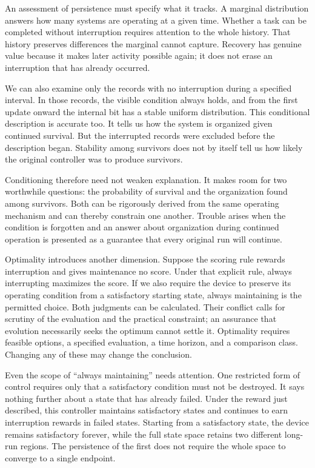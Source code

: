 \documentclass[
  english,
  11pt,
  oneside]{book}
\begin{document}
An assessment of persistence must specify what it tracks. A marginal distribution answers how many systems are operating at a given time. Whether a task can be completed without interruption requires attention to the whole history. That history preserves differences the marginal cannot capture. Recovery has genuine value because it makes later activity possible again; it does not erase an interruption that has already occurred.

We can also examine only the records with no interruption during a specified interval. In those records, the visible condition always holds, and from the first update onward the internal bit has a stable uniform distribution. This conditional description is accurate too. It tells us how the system is organized given continued survival. But the interrupted records were excluded before the description began. Stability among survivors does not by itself tell us how likely the original controller was to produce survivors.

Conditioning therefore need not weaken explanation. It makes room for two worthwhile questions: the probability of survival and the organization found among survivors. Both can be rigorously derived from the same operating mechanism and can thereby constrain one another. Trouble arises when the condition is forgotten and an answer about organization during continued operation is presented as a guarantee that every original run will continue.

Optimality introduces another dimension. Suppose the scoring rule rewards interruption and gives maintenance no score. Under that explicit rule, always interrupting maximizes the score. If we also require the device to preserve its operating condition from a satisfactory starting state, always maintaining is the permitted choice. Both judgments can be calculated. Their conflict calls for scrutiny of the evaluation and the practical constraint; an assurance that evolution necessarily seeks the optimum cannot settle it. Optimality requires feasible options, a specified evaluation, a time horizon, and a comparison class. Changing any of these may change the conclusion.

Even the scope of ``always maintaining'' needs attention. One restricted form of control requires only that a satisfactory condition must not be destroyed. It says nothing further about a state that has already failed. Under the reward just described, this controller maintains satisfactory states and continues to earn interruption rewards in failed states. Starting from a satisfactory state, the device remains satisfactory forever, while the full state space retains two different long-run regions. The persistence of the first does not require the whole space to converge to a single endpoint.
\end{document}
